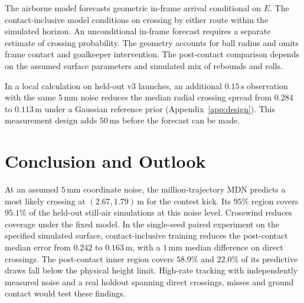 \documentclass[11pt,a4paper]{article}
\begin{document}
The airborne model forecasts geometric in-frame arrival conditional on $E$. The contact-inclusive model conditions on crossing by either route within the simulated horizon. An unconditional in-frame forecast requires a separate estimate of crossing probability. The geometry accounts for ball radius and omits frame contact and goalkeeper intervention. The post-contact comparison depends on the assumed surface parameters and simulated mix of rebounds and rolls.

In a local calculation on held-out v3 launches, an additional $0.15\,\mathrm{s}$ observation with the same $5\,\mathrm{mm}$ noise reduces the median radial crossing spread from $0.284$ to $0.113\,\mathrm{m}$ under a Gaussian reference prior (Appendix~\ref{app:design}). This measurement design adds $50\,\mathrm{ms}$ before the forecast can be made.

\section{Conclusion and Outlook}

At an assumed $5\,\mathrm{mm}$ coordinate noise, the million-trajectory MDN predicts a most likely crossing at $(2.67,1.79)\,\mathrm{m}$ for the contest kick. Its $95\%$ region covers $95.1\%$ of the held-out still-air simulations at this noise level. Crosswind reduces coverage under the fixed model. In the single-seed paired experiment on the specified simulated surface, contact-inclusive training reduces the post-contact median error from $0.242$ to $0.163\,\mathrm{m}$, with a $1\,\mathrm{mm}$ median difference on direct crossings. The post-contact inner region covers $58.9\%$ and $22.0\%$ of its predictive draws fall below the physical height limit. High-rate tracking with independently measured noise and a real holdout spanning direct crossings, misses and ground contact would test these findings.
\end{document}
